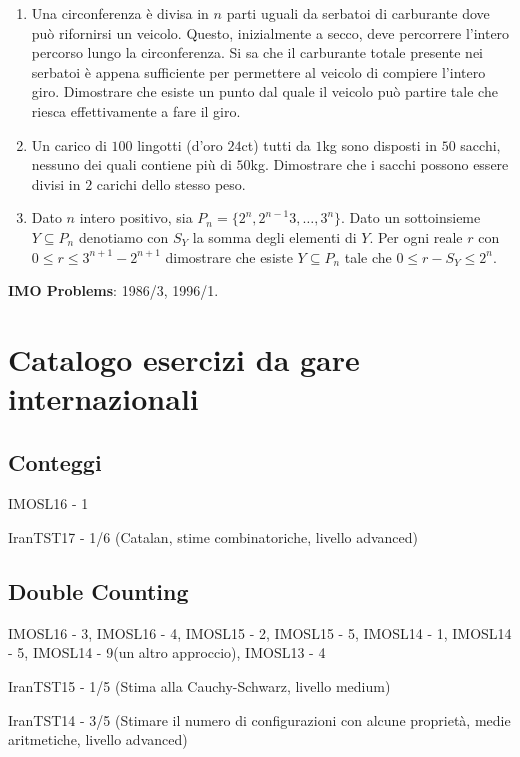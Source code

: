 \documentclass[a4paper,10pt]{article}
\newcommand{\Pro}[3]{#1#2 - #3}
\begin{document}
\begin{enumerate}
	\item Una circonferenza \`e divisa in $n$ parti uguali da serbatoi di carburante dove pu\`o rifornirsi un veicolo. Questo, inizialmente a secco, deve percorrere l'intero percorso lungo la circonferenza. Si sa che il carburante totale presente nei serbatoi \`e appena sufficiente per permettere al veicolo di compiere l'intero giro. Dimostrare che esiste un punto dal quale il veicolo pu\`o partire tale che riesca effettivamente a fare il giro.

	\item Un carico di $100$ lingotti (d'oro $24$ct) tutti da $1$kg sono disposti in $50$ sacchi, nessuno dei quali contiene pi\`u di $50$kg. Dimostrare che i sacchi possono essere divisi in $2$ carichi dello stesso peso.

	\item Dato $n$ intero positivo, sia $P_n=\{2^n,2^{n-1}3,\dots,3^n\}$. Dato un sottoinsieme $Y\subseteq P_n$ denotiamo con $S_Y$ la somma degli elementi di $Y$. Per ogni reale $r$ con $0\leq r \leq 3^{n+1} -	2^{n+1}$ dimostrare che esiste $Y\subseteq P_n$ tale che $0\leq r-S_Y \leq 2^n$.

\end{enumerate}
\bigskip\bigskip

\textbf{IMO Problems}: 1986/3, 1996/1.


\section{Catalogo esercizi da gare internazionali}

\subsection{Conteggi}
\Pro{IMOSL}{16}{1}

\Pro{IranTST}{17}{1/6} (Catalan, stime combinatoriche, livello advanced)


\subsection{Double Counting}
\Pro{IMOSL}{16}{3}, \Pro{IMOSL}{16}{4}, \Pro{IMOSL}{15}{2}, \Pro{IMOSL}{15}{5}, \Pro{IMOSL}{14}{1}, \Pro{IMOSL}{14}{5}, \Pro{IMOSL}{14}{9}(un altro approccio), \Pro{IMOSL}{13}{4}

\Pro{IranTST}{15}{1/5} (Stima alla Cauchy-Schwarz, livello medium)

\Pro{IranTST}{14}{3/5} (Stimare il numero di configurazioni con alcune proprietà, medie aritmetiche, livello advanced)
\end{document}
